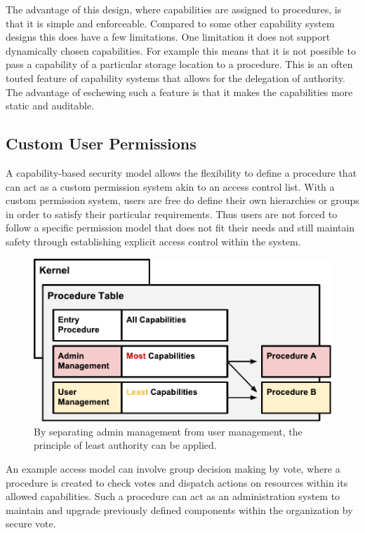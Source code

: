 \documentclass[english,a4paper]{article}
\begin{document}
The advantage of this design, where capabilities are assigned to
procedures, is that it is simple and enforceable. Compared to some other
capability system designs this does have a few limitations. One
limitation it does not support dynamically chosen capabilities. For
example this means that it is not possible to pass a capability of a
particular storage location to a procedure. This is an often touted
feature of capability systems that allows for the delegation of
authority. The advantage of eschewing such a feature is that it makes
the capabilities more static and auditable.

\subsection{Custom User Permissions}\label{custom-user-permissions}

A capability-based security model allows the flexibility to define a
procedure that can act as a custom permission system akin to an access
control list. With a custom permission system, users are free do define
their own hierarchies or groups in order to satisfy their particular
requirements. Thus users are not forced to follow a specific permission
model that does not fit their needs and still maintain safety through
establishing explicit access control within the system.

\begin{figure}[htbp]
\centering
\includegraphics[width=1\textwidth]{media/Separation.pdf}
\caption{By separating admin management from user management, the
principle of least authority can be applied.}
\end{figure}

An example access model can involve group decision making by vote, where
a procedure is created to check votes and dispatch actions on resources
within its allowed capabilities. Such a procedure can act as an
administration system to maintain and upgrade previously defined
components within the organization by secure vote.
\end{document}
